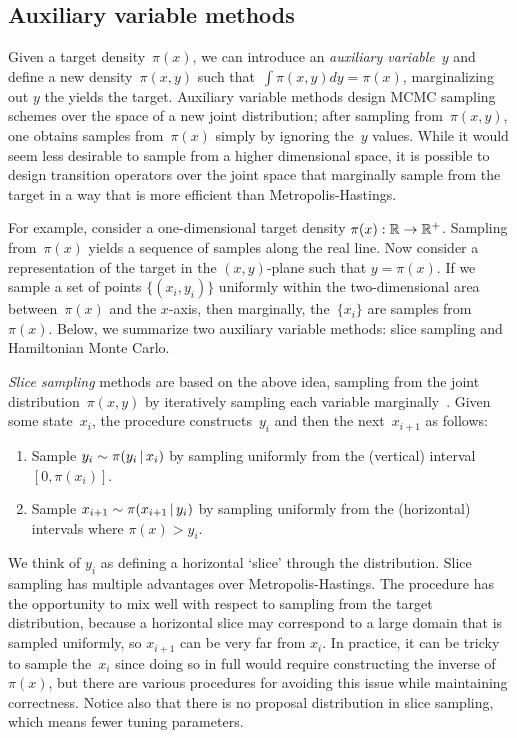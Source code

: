 \documentclass[angelino.tex]{subfiles}
\begin{document}
\subsection{Auxiliary variable methods}

Given a target density~$\pi(x)$, we can introduce an
\emph{auxiliary variable}~$y$ and define a new density~$\pi(x, y)$
such that~$\int \pi(x, y) dy = \pi(x)$,
\ie marginalizing out $y$ the yields the target.
Auxiliary variable methods design MCMC sampling schemes over the space of a new
joint distribution; after sampling from~$\pi(x, y)$, one obtains samples 
from~$\pi(x)$ simply by ignoring the~$y$ values.
While it would seem less desirable to sample from a higher dimensional space,
it is possible to design transition operators over the joint space that
marginally sample from the target in a way that is more efficient than
Metropolis-Hastings.

For example, consider a one-dimensional target density
$\pi(x): \mathbb{R} \rightarrow \mathbb{R}^+$.
Sampling from~$\pi(x)$ yields a sequence of samples along the real line.
Now consider a representation of the target in the $(x, y)$-plane
such that $y = \pi(x)$.
If we sample a set of points $\{(x_i, y_i)\}$ uniformly within the 
two-dimensional area between~$\pi(x)$ and the $x$-axis, then marginally,
the~$\{x_i\}$ are samples from~$\pi(x)$.
Below, we summarize two auxiliary variable methods:
slice sampling and Hamiltonian Monte Carlo.

\emph{Slice sampling} methods are based on the above idea, sampling from the
joint distribution~$\pi(x, y)$ by iteratively sampling each variable 
marginally~\citep{neal:2003-slice}.
Given some state~$x_i$, the procedure constructs~$y_i$ and then
the next~$x_{i+1}$ as follows:
\begin{enumerate}
\item Sample $y_i \sim \pi(y_i \,|\, x_i)$ by sampling
      uniformly from the (vertical) interval $[0, \pi(x_i)]$.
\item Sample $x_{i+1} \sim \pi(x_{i+1} \,|\, y_i)$ by sampling uniformly
      from the (horizontal) intervals where $\pi(x) > y_i$.
\end{enumerate}
We think of $y_i$ as defining a horizontal `slice' through the distribution.
Slice sampling has multiple advantages over Metropolis-Hastings.
The procedure has the opportunity to mix well with respect to sampling from
the target distribution, because a horizontal slice may correspond to a
large domain that is sampled uniformly, so $x_{i+1}$ can be very far from $x_i$.
In practice, it can be tricky to sample the~$x_i$ since doing so in full
would require constructing the inverse of $\pi(x)$, but there are various
procedures for avoiding this issue while maintaining correctness.
Notice also that there is no proposal distribution in slice sampling,
which means fewer tuning parameters. %
\end{document}

